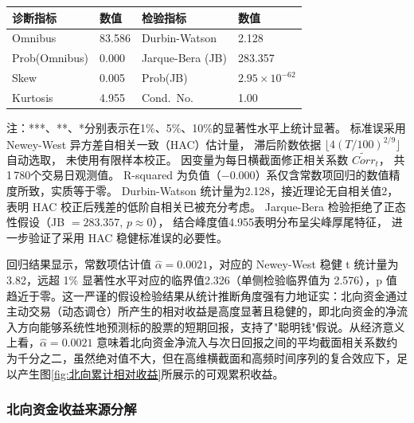 \documentclass{article}
\begin{document}
\begin{table}[htbp]
\begin{threeparttable}
\vspace{6pt}

\begin{tabular}{@{}ll@{\hskip 24pt}ll@{}}
\toprule
\textbf{诊断指标} & \textbf{数值} & \textbf{检验指标} & \textbf{数值} \\
\midrule
Omnibus        & 83.586  & Durbin-Watson      & 2.128        \\
Prob(Omnibus)  & 0.000   & Jarque-Bera (JB)   & 283.357      \\
Skew           & 0.005   & Prob(JB)           & $2.95\times10^{-62}$ \\
Kurtosis       & 4.955   & Cond.\ No.         & 1.00         \\
\bottomrule
\end{tabular}

\begin{tablenotes}\footnotesize
\item[\dag] 注：***、**、*分别表示在1\%、5\%、10\%的显著性水平上统计显著。
标准误采用 Newey-West 异方差自相关一致（HAC）估计量，
滞后阶数依据 $\lfloor 4(T/100)^{2/9} \rfloor$ 自动选取，
未使用有限样本校正。
因变量为每日横截面修正相关系数 $\widetilde{Corr}_t$，
共1\,780个交易日观测值。
R-squared 为负值（$-0.000$）系仅含常数项回归的数值精度所致，实质等于零。
Durbin-Watson 统计量为2.128，接近理论无自相关值2，
表明 HAC 校正后残差的低阶自相关已被充分考虑。
Jarque-Bera 检验拒绝了正态性假设（JB $= 283.357$, $p \approx 0$），
结合峰度值4.955表明分布呈尖峰厚尾特征，
进一步验证了采用 HAC 稳健标准误的必要性。
\end{tablenotes}

\end{threeparttable}
\end{table}

回归结果显示，常数项估计值 $\hat{\alpha} = 0.0021$，对应的 Newey-West 稳健 t 统计量为 3.82，远超 1\% 显著性水平对应的临界值2.326（单侧检验临界值为 2.576），p 值趋近于零。这一严谨的假设检验结果从统计推断角度强有力地证实：北向资金通过主动交易（动态调仓）所产生的相对收益是高度显著且稳健的，即北向资金的净流入方向能够系统性地预测标的股票的短期回报，支持了"聪明钱"假说。从经济意义上看，$\hat{\alpha} = 0.0021$ 意味着北向资金净流入与次日回报之间的平均截面相关系数约为千分之二，虽然绝对值不大，但在高维横截面和高频时间序列的复合效应下，足以产生图\ref{fig:北向累计相对收益}所展示的可观累积收益。

\subsubsection{北向资金收益来源分解}
\label{subsec:return_decomposition}
\end{document}
